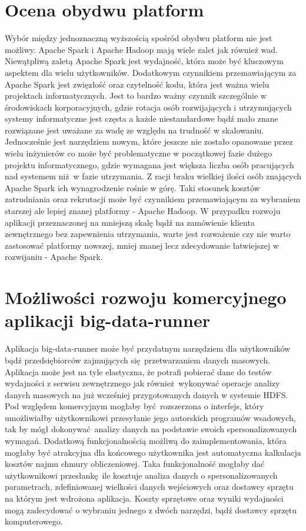 \section{Ocena obydwu platform}
Wybór między jednoznaczną wyższością spośród obydwu platform nie jest możliwy. Apache Spark i Apache Hadoop mają wiele zalet jak również wad. Niewątpliwą zaletą Apache Spark jest wydajność, która może być kluczowym aspektem dla wielu użytkowników. Dodatkowym czynnikiem przemawiającym za Apache Spark jest zwięzłość oraz czytelność kodu, która jest ważna wielu projektach informatycznych. Jest to bardzo ważny czynnik szczególnie w środowiskach korporacyjnych, gdzie rotacja osób rozwijających i utrzymujących systemy informatyczne jest częsta a każde niestandardowe bądź mało znane rozwiązane jest uważane za wadę ze względu na trudność w skalowaniu. Jednocześnie jest narzędziem nowym, które jeszcze nie zostało opanowane przez wielu inżynierów co może być problematyczne w początkowej fazie dużego projektu informatycznego, gdzie wymagana jest większa liczba osób pracujących nad systemem niż w fazie utrzymania. Z racji braku wielkiej ilości osób znających Apache Spark ich wynagrodzenie rośnie w górę. Taki stosunek kosztów zatrudniania oraz rekrutacji może być czynnikiem przemawiającym za wybraniem starszej ale lepiej znanej platformy - Apache Hadoop. W przypadku rozwoju aplikacji przeznaczonej na mniejszą skalę bądź na zamówienie klienta zewnętrznego bez zapewnienia utrzymania, warte jest rozważenie czy nie warto zastosować platformy nowszej, mniej znanej lecz zdecydowanie łatwiejszej w rozwijaniu - Apache Spark.
\section{Możliwości rozwoju komercyjnego aplikacji big-data-runner}
Aplikacja big-data-runner może być przydatnym narzędziem dla użytkowników bądź przedsiębiorców zajmujących się przetwarzaniem danych masowych. Aplikacja może jest na tyle elastyczna, że potrafi pobierać dane do testów wydajności z serwisu zewnętrznego jak również wykonywać operacje analizy danych masowych na już wcześniej przygotowanych danych w systemie HDFS. Pod względem komercyjnym mogłaby być rozszerzona o interfejs, który umożliwiałby użytkownikowi przesyłanie jego autorskich programów wsadowych, tak by mógł dokonywać analizy danych na podstawie swoich spersonalizowanych wymagań. Dodatkową funkcjonalnością możliwą do zaimplementowania, która mogłaby być atrakcyjna dla końcowego użytkownika jest automatyczna kalkulacja kosztów najmu chmury obliczeniowej. Taka funkcjonalność mogłaby dać użytkownikowi przesłankę ile kosztuje analiza danych o spersonalizowanych parametrach, zdefiniowanej wielkości danych wejściowych oraz dostawcy sprzętu na którym jest wdrożona aplikacja. Koszty sprzętowe oraz wyniki wydajności mogą zadecydować o wybraniu jednego z dwóch narzędzi, bądź dostawcy sprzętu komputerowego.
